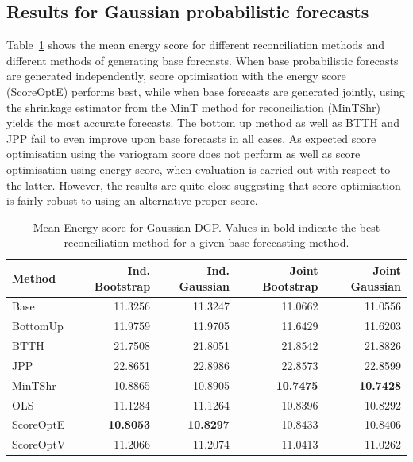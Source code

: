 \documentclass[12pt]{article}
\theoremstyle{definition}
\begin{document}
\subsection{Results for Gaussian probabilistic forecasts}\label{sec:SimAnalysticalResults}

Table~\ref{tab:gse} shows the mean energy score for different reconciliation methods and different methods of generating base forecasts.  When base probabilistic forecasts are generated independently, score optimisation with the energy score (ScoreOptE) performs best, while when base forecasts are generated jointly, using the shrinkage estimator from the MinT method for reconciliation  (MinTShr) yields the most accurate forecasts.  The bottom up method as well as BTTH and JPP fail to even improve upon base forecasts in all cases.  As expected score optimisation using the variogram score does not perform as well as score optimisation using energy score, when evaluation is carried out with respect to the latter.  However, the results are quite close suggesting that score optimisation is fairly robust to using an alternative proper score.

\begin{table}[H]
	\footnotesize
	\caption{\label{tab:gse}Mean Energy score for Gaussian DGP.  Values in bold indicate the best reconciliation method for a given base forecasting method.}
	\centering
	\begin{tabular}[t]{l|r|r|r|r}
		\hline
		Method & Ind. Bootstrap & Ind. Gaussian & Joint Bootstrap & Joint Gaussian\\
		\hline
		Base & 11.3256 & 11.3247 & 11.0662 & 11.0556\\
		\hline
		BottomUp & 11.9759 & 11.9705 & 11.6429 & 11.6203\\
		\hline
		BTTH & 21.7508 & 21.8051 & 21.8542 & 21.8826\\
		\hline
		JPP & 22.8651 & 22.8986 & 22.8573 & 22.8599\\
		\hline
		MinTShr & 10.8865 & 10.8905 & \textbf{10.7475} & \textbf{10.7428}\\
		\hline
		OLS & 11.1284 & 11.1264 & 10.8396 & 10.8292\\
		\hline
		ScoreOptE & \textbf{10.8053} & \textbf{10.8297} & 10.8433 & 10.8406\\
		\hline
		ScoreOptV & 11.2066 & 11.2074 & 11.0413 & 11.0262\\
		\hline
	\end{tabular}
\end{table}
\end{document}
